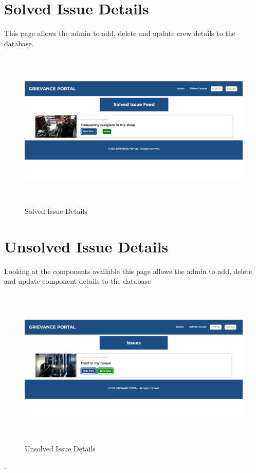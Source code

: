 \documentclass[12pt,a4paper]{report}
\begin{document}
\section{Solved Issue Details}
This page allows the admin to add, delete and update crew details to the database.
\begin{figure}[hbtp]
\centering
\includegraphics[width=6in,height=3in]{sissue.png}
\caption{Solved Issue  Details}
\end{figure}
\section{Unsolved Issue Details}
Looking at the components available this page allows the admin to add, delete and update component details to the database
\begin{figure}[hbtp]
\centering
\includegraphics[width=6in,height=3in]{cissue.png}
\caption{Unsolved Issue Details}
\end{figure}.
\vspace{1in}
\end{document}
